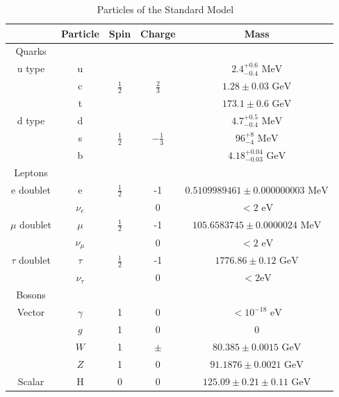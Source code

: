 \begin{table}[h]
\begin{center}
\footnotesize
\begin{tabular}[h]{|c||c|c|c|c|}
\hline
 & Particle & Spin & Charge & Mass \\
\hline\hline
Quarks &&&&\\
\hline
u type &u& & &${2.4^{+0.6}_{-0.4} \text{ MeV}}$\\
 &c&${\frac{1}{2}}$&${\frac{2}{3}}$&${1.28\pm{0.03} \text{ GeV}}$\\
 &t& & &${173.1\pm{0.6} \text{ GeV}}$\\
\hline
d type & d& & & ${4.7^{+0.5}_{-0.4} \text{ MeV}}$\\
 & s & ${\frac{1}{2}}$ & ${-\frac{1}{3}}$ & ${96^{+8}_{-4} \text{ MeV}}$\\
 & b & & & ${4.18^{+0.04}_{-0.03} \text{ GeV}}$\\
\hline\hline
Leptons &&&&\\
\hline
e doublet & e & ${\frac{1}{2}}$ & -1 &${0.5109989461\pm{}0.000000003 \text{ MeV}}$\\
 & ${\nu_{e}}$ & & 0 & ${< 2 \text{ eV}}$\\
 \hline
${\mu}$ doublet & ${\mu}$ & ${\frac{1}{2}}$ & -1 &${105.6583745\pm{}0.0000024 \text{ MeV}}$\\
 & ${\nu_{\mu}}$ & & 0 & ${< 2 \text{ eV}}$\\
 \hline
${\tau}$ doublet & ${\tau}$ & ${\frac{1}{2}}$ & -1 &${1776.86\pm{}0.12 \text{ GeV}}$\\
 & ${\nu_{\tau}}$ & & 0 & ${< 2 \text{eV}}$\\
 \hline\hline
 Bosons &&&&\\
 \hline
 Vector & ${\gamma}$ & 1 & 0 & ${< 10^{-18} \text{ eV}}$\\
 & ${g}$ & 1 & 0 & ${0}$\\
 & ${W}$ & 1 & ${\pm}$ & ${80.385\pm{}0.0015 \text{ GeV}}$\\
 & ${Z}$ & 1 & 0 & ${91.1876\pm{}0.0021 \text{ GeV}}$\\
 \hline
 Scalar & H & 0& 0 & ${125.09\pm{}0.21\pm{}0.11 \text{ GeV}}$\\
 \hline
\end{tabular}
\caption[Particles of the Standard Model]{Particles of the Standard Model ~\cite{PhysRevD.98.030001}}
\label{tab:SM}
\end{center}
\end{table}

